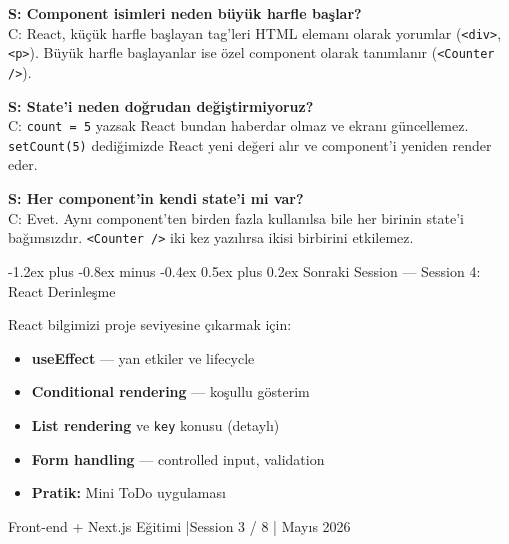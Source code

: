 \documentclass[12pt, a4paper]{article}
\makeatletter
\renewcommand{\subsection}{%
  \@startsection{subsection}{2}{\z@}%
    {-1.2ex plus -0.8ex minus -0.4ex}%
    {0.5ex plus 0.2ex}%
    {\normalfont\large\bfseries\sffamily\color{secondary}}%
}
\makeatother
\begin{document}
\begin{warningbox}
\textbf{S: Component isimleri neden büyük harfle başlar?}\\
C: React, küçük harfle başlayan tag'leri HTML elemanı olarak yorumlar
(\texttt{<div>}, \texttt{<p>}). Büyük harfle başlayanlar ise
özel component olarak tanımlanır (\texttt{<Counter />}).

\vspace{6pt}
\textbf{S: State'i neden doğrudan değiştirmiyoruz?}\\
C: \texttt{count = 5} yazsak React bundan haberdar olmaz ve
ekranı güncellemez. \texttt{setCount(5)} dediğimizde React yeni
değeri alır ve component'i yeniden render eder.

\vspace{6pt}
\textbf{S: Her component'in kendi state'i mi var?}\\
C: Evet. Aynı component'ten birden fazla kullanılsa bile her birinin
state'i bağımsızdır. \texttt{<Counter />} iki kez yazılırsa ikisi
birbirini etkilemez.
\end{warningbox}

\vspace{6pt}

\subsection{Sonraki Session --- Session 4: React Derinleşme}

\begin{infobox}
React bilgimizi proje seviyesine çıkarmak için:
\begin{itemize}
  \item \textbf{useEffect} --- yan etkiler ve lifecycle
  \item \textbf{Conditional rendering} --- koşullu gösterim
  \item \textbf{List rendering} ve \texttt{key} konusu (detaylı)
  \item \textbf{Form handling} --- controlled input, validation
  \item \textbf{Pratik:} Mini ToDo uygulaması
\end{itemize}
\end{infobox}

\vspace{16pt}
\begin{center}
  \color{gray}\sffamily\small
  Front-end + Next.js Eğitimi \quad|\quad Session 3 / 8 \quad| Mayıs 2026
\end{center}
\end{document}
